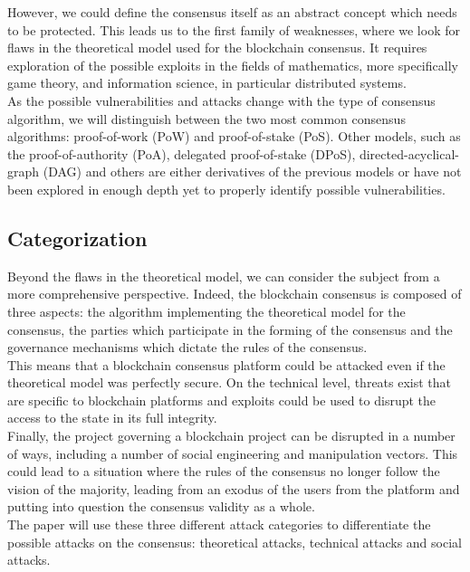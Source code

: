 \documentclass[11pt,a4paper,draft]{article}
\begin{document}
However, we could define the consensus itself as an abstract concept which needs to be protected. This leads us to the first family of weaknesses, where we look for flaws in the theoretical model used for the blockchain consensus. It requires exploration of the possible exploits in the fields of mathematics, more specifically game theory, and information science, in particular distributed systems.\\

As the possible vulnerabilities and attacks change with the type of consensus algorithm, we will distinguish between the two most common consensus algorithms: proof-of-work (PoW) and proof-of-stake (PoS). Other models, such as the proof-of-authority (PoA), delegated proof-of-stake (DPoS), directed-acyclical-graph (DAG) and others are either derivatives of the previous models or have not been explored in enough depth yet to properly identify possible vulnerabilities.\\

\subsection{Categorization}

Beyond the flaws in the theoretical model, we can consider the subject from a more comprehensive perspective. Indeed, the blockchain consensus is composed of three aspects: the algorithm implementing the theoretical model for the consensus, the parties which participate in the forming of the consensus and the governance mechanisms which dictate the rules of the consensus.\\

This means that a blockchain consensus platform could be attacked even if the theoretical model was perfectly secure. On the technical level, threats exist that are specific to blockchain platforms and exploits could be used to disrupt the access to the state in its full integrity.\\

Finally, the project governing a blockchain project can be disrupted in a number of ways, including a number of social engineering and manipulation vectors. This could lead to a situation where the rules of the consensus no longer follow the vision of the majority, leading from an exodus of the users from the platform and putting into question the consensus validity as a whole.\\

The paper will use these three different attack categories to differentiate the possible attacks on the consensus: theoretical attacks, technical attacks and social attacks.\\
\end{document}
